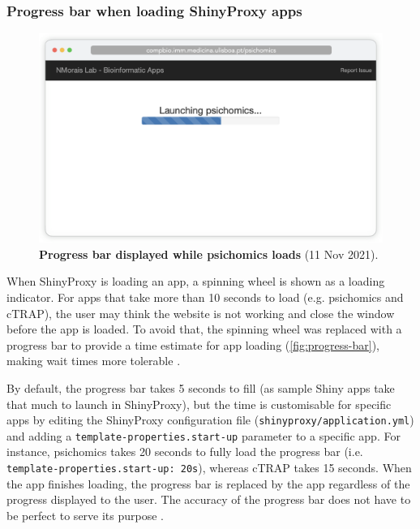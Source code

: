 \subsubsection{Progress bar when loading ShinyProxy apps}

\begin{figure}
  \vspace{-\intextsep}
  \includegraphics[width=\linewidth]{images/app-server/progress-bar}
  \caption[Screenshot of app loading]{\textbf{Progress bar displayed while psichomics loads} (11 Nov 2021).}
  \label{fig:progress-bar}
  \vspace{-\intextsep}
\end{figure}


When ShinyProxy is loading an app, a spinning wheel is shown as a loading indicator. For apps that take more than 10 seconds to load (e.g. psichomics and cTRAP), the user may think the website is not working and close the window before the app is loaded. To avoid that, the spinning wheel was replaced with a progress bar to provide a time estimate for app loading (\autoref{fig:progress-bar}), making wait times more tolerable \cite{myers:1985us,yablonski:2020ts}.

By default, the progress bar takes 5 seconds to fill (as sample Shiny apps take that much to launch in ShinyProxy), but the time is customisable for specific apps by editing the ShinyProxy configuration file (\texttt{shinyproxy/application.yml}) and adding a \texttt{template-properties.start-up} parameter to a specific app. For instance, psichomics takes 20 seconds to fully load the progress bar (i.e. \texttt{template-properties.start-up: 20s}), whereas cTRAP takes 15 seconds. When the app finishes loading, the progress bar is replaced by the app regardless of the progress displayed to the user. The accuracy of the progress bar does not have to be perfect to serve its purpose \cite{myers:1985us,yablonski:2020ts}.


